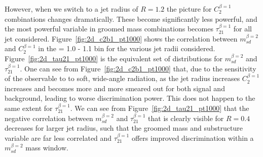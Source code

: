 However, when we switch to a jet radius of $R=1.2$ the picture for
$C_2^{\beta=1}$ combinations changes dramatically. These become
significantly less powerful, and the most powerful variable in groomed
mass combinations becomes $\tau_{21}^{\beta=1}$ for all jet
\pt considered. Figure~\ref{fig:2d_c2b1_pt1000} shows the correlation between
$m_{sd}^{\beta=2}$ and $C_2^{\beta=1}$ in the \pt = 1.0 - 1.1 \TeV bin for
the various jet radii considered. Figure~\ref{fig:2d_tau21_pt1000} is
the equivalent set of distributions for $m_{sd}^{\beta=2}$ and
$\tau_{21}^{\beta=1}$. One can see from
Figure~\ref{fig:2d_c2b1_pt1000} that, due to the sensitivity of the
observable to to soft, wide-angle radiation, as the jet radius increases
$C_2^{\beta=1}$ increases and becomes more and more smeared out for both signal and
background, leading to worse discrimination power. This does not
happen to the same extent for $\tau_{21}^{\beta=1}$. We can see from Figure~\ref{fig:2d_tau21_pt1000} that
the negative correlation between $m_{sd}^{\beta=2}$ and
$\tau_{21}^{\beta=1}$ that is clearly visible for $R=0.4$ decreases for
larger jet radius, such that the groomed mass and substructure variable
are far less correlated and $\tau_{21}^{\beta=1}$ offers improved
discrimination within a $m_{sd}^{\beta=2}$ mass window.



